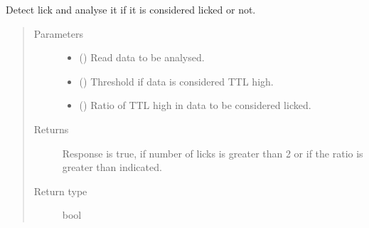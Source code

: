 \documentclass[letterpaper,10pt,english]{sphinxmanual}
\begin{document}

\begin{fulllineitems}
\label{\detokenize{NoSeMazeControl/TrialLogic:TrialLogic.TrialConditions.lick_detect}}
\pysigstartsignatures
{}
\pysigstopsignatures
\sphinxAtStartPar
Detect lick and analyse it if it is considered licked or not.
\begin{quote}\begin{description}
\item[{Parameters}] \leavevmode\begin{itemize}
\item {} 
\sphinxAtStartPar
{} () \textendash{} Read data to be analysed.

\item {} 
\sphinxAtStartPar
{} () \textendash{} Threshold if data is considered TTL high.

\item {} 
\sphinxAtStartPar
{} () \textendash{} Ratio of TTL high in data to be considered licked.

\end{itemize}

\item[{Returns}] \leavevmode
\sphinxAtStartPar
{} \textendash{} Response is true, if number of licks is greater than 2 or if the ratio
is greater than indicated.

\item[{Return type}] \leavevmode
\sphinxAtStartPar
bool

\end{description}\end{quote}

\end{fulllineitems}

\end{document}

